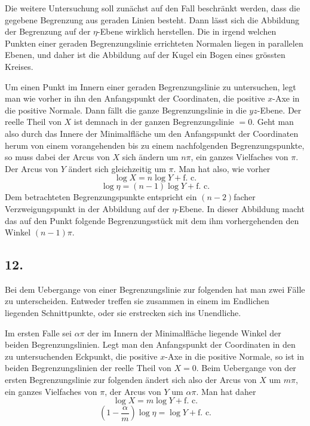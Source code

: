 \documentclass[12pt,a4paper]{article}
\begin{document}
Die weitere Untersuchung soll zun\"achst auf den Fall beschr\"ankt werden, dass die gegebene Begrenzung aus geraden Linien besteht. Dann l\"asst sich die Abbildung der Begrenzung auf der $\eta$-Ebene wirklich herstellen. Die in irgend welchen Punkten einer geraden Begrenzungslinie errichteten Normalen liegen in parallelen Ebenen, und daher ist die Abbildung auf der Kugel ein Bogen eines gr\"ossten Kreises.

Um einen Punkt im Innern einer geraden Begrenzungslinie zu untersuchen, legt man wie vorher in ihn den Anfangspunkt der Coordinaten, die positive $x$-Axe in die positive Normale. Dann f\"allt die ganze Begrenzungslinie in die $yz$-Ebene. Der reelle Theil von $X$ ist demnach in der ganzen Begrenzungslinie $=0$. Geht man also durch das Innere der Minimalfl\"ache um den Anfangspunkt der Coordinaten herum von einem vorangehenden bis zu einem nachfolgenden Begrenzungspunkte, so muss dabei der Arcus von $X$ sich \"andern um $n\pi$, ein ganzes Vielfaches von $\pi$. Der Arcus von $Y$ \"andert sich gleichzeitig um $\pi$. Man hat also, wie vorher
\[\log X = n\log Y + \text{f.\ c.}\]
\[\log \eta = (n-1)\log Y + \text{f.\ c.}\]
Dem betrachteten Begrenzungspunkte entspricht ein $(n-2)$facher Verzweigungspunkt in der Abbildung auf der $\eta$-Ebene. In dieser Abbildung macht das auf den Punkt folgende Begrenzungsst\"uck mit dem ihm vorhergehenden den Winkel $(n-1)\pi$.

\subsection*{12.}

Bei dem Uebergange von einer Begrenzungslinie zur folgenden hat man zwei F\"alle zu unterscheiden. Entweder treffen sie zusammen in einem im Endlichen liegenden Schnittpunkte, oder sie erstrecken sich ins Unendliche.

Im ersten Falle sei $\alpha\pi$ der im Innern der Minimalfl\"ache liegende Winkel der beiden Begrenzungslinien. Legt man den Anfangspunkt der Coordinaten in den zu untersuchenden Eckpunkt, die positive $x$-Axe in die positive Normale, so ist in beiden Begrenzungslinien der reelle Theil von $X = 0$. Beim Uebergange von der ersten Begrenzungslinie zur folgenden \"andert sich also der Arcus von $X$ um $m\pi$, ein ganzes Vielfaches von $\pi$, der Arcus von $Y$ um $\alpha\pi$. Man hat daher
\[\log X = m\log Y + \text{f.\ c.}\]
\[\left(1 - \frac{\alpha}{m}\right)\log\eta = \log Y + \text{f.\ c.}\]
\end{document}

